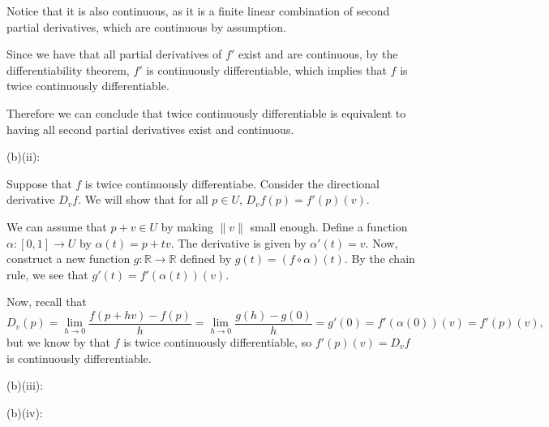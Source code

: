\documentclass{article}
\theoremstyle{plain} %
\numberwithin{thm}{section} %
\theoremstyle{definition}
\begin{document}
\begin{question}{28}
        Notice that it is also continuous, as it is a finite linear combination of second partial derivatives, which are continuous by assumption.
        
        Since we have that all partial derivatives of \(f'\) exist and are continuous, by the differentiability theorem, \(f'\) is continuously differentiable, which implies that \(f\) is twice continuously differentiable.

        Therefore we can conclude that twice continuously differentiable is equivalent to having all second partial derivatives exist and continuous.

        \medskip

        (b)(ii):

        Suppose that \(f\) is twice continuously differentiabe. Consider the directional derivative \(D_v f\). We will show that for all \(p\in U\), \(D_v f(p) = f'(p)(v)\).

        We can assume that \(p + v \in U\) by making \(\|v\|\) small enough. Define a function \(\alpha : [0,1] \to U\) by \(\alpha (t) = p + tv\). The derivative is given by \(\alpha '(t) = v\). Now, construct a new function \(g : \mathbb{R} \to \mathbb{R}\) defined by \(g(t) = (f \circ \alpha) (t)\). By the chain rule, we see that \(g'(t) = f'(\alpha (t)) (v)\).

        Now, recall that
        \[
            D_v(p) = \lim_{h \to 0} \frac{f(p + hv) - f(p)}{h} = \lim_{h \to 0} \frac{g(h) - g(0)}{h} = g'(0) = f'(\alpha (0))(v) = f'(p)(v),
        \]
        but we know by that \(f\) is twice continuously differentiable, so \(f'(p)(v) = D_v f\) is continuously differentiable.

        \medskip

        (b)(iii):

        (b)(iv):
    \end{question}
\end{document}
